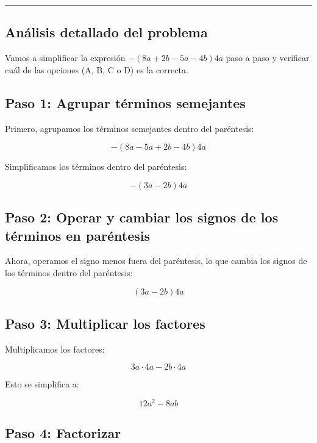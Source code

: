 \documentclass[
]{article}
\begin{document}
\begin{center}\rule{0.5\linewidth}{0.5pt}\end{center}

\subsection{Análisis detallado del
problema}\label{anuxe1lisis-detallado-del-problema-5}

Vamos a simplificar la expresión \(-(8a + 2b - 5a - 4b)4a\) paso a paso
y verificar cuál de las opciones (A, B, C o D) es la correcta.

\subsection{Paso 1: Agrupar términos
semejantes}\label{paso-1-agrupar-tuxe9rminos-semejantes}

Primero, agrupamos los términos semejantes dentro del paréntesis:

\[
-(8a - 5a + 2b - 4b)4a
\]

Simplificamos los términos dentro del paréntesis:

\[
-(3a - 2b)4a
\]

\subsection{Paso 2: Operar y cambiar los signos de los términos en
paréntesis}\label{paso-2-operar-y-cambiar-los-signos-de-los-tuxe9rminos-en-paruxe9ntesis}

Ahora, operamos el signo menos fuera del paréntesis, lo que cambia los
signos de los términos dentro del paréntesis:

\[
(3a - 2b)4a
\]

\subsection{Paso 3: Multiplicar los
factores}\label{paso-3-multiplicar-los-factores}

Multiplicamos los factores:

\[
3a \cdot 4a - 2b \cdot 4a
\]

Esto se simplifica a:

\[
12a^2 - 8ab
\]

\subsection{Paso 4: Factorizar}\label{paso-4-factorizar}
\end{document}
